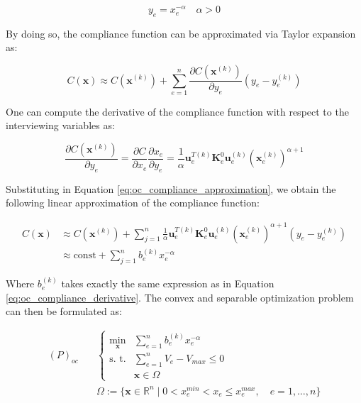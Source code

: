 \begin{equation}
    y_e = x_e^{-\alpha} \quad \alpha > 0
    \label{eq:oc_interviewing_variables}
\end{equation}

By doing so, the compliance function can be approximated via Taylor expansion as:

\begin{equation}
    C(\bm{x}) \approx C(\bm{x}^{(k)}) + \sum_{e=1}^{n} \frac{\partial C(\bm{x}^{(k)})}{\partial y_e}  (y_e - y_e^{(k)})
    \label{eq:oc_compliance_approximation}
\end{equation}

One can compute the derivative of the compliance function with respect to the interviewing variables as:

\begin{equation}
    \frac{\partial C(\bm{x}^{(k)})}{\partial y_e} = \frac{\partial C}{\partial x_e} \frac{\partial x_e}{\partial y_e} = \frac{1}{\alpha} \bm{u}_e^{T(k)} \bm{K}_{e}^0 \bm{u}_e^{(k)} (\bm{x}_e^{(k)})^{\alpha + 1}
    \label{eq:oc_compliance_derivative}
\end{equation}

Substituting in Equation \ref{eq:oc_compliance_approximation}, we obtain the following linear approximation of the compliance function:

\begin{equation}
    \begin{aligned}
        C(\bm{x}) & \approx C(\bm{x}^{(k)}) + \sum_{j=1}^{n} \frac{1}{\alpha} \bm{u}_e^{T(k)} \bm{K}_{e}^0 \bm{u}_e^{(k)} (\bm{x}_e^{(k)})^{\alpha + 1} (y_e - y_e^{(k)}) \\
                  & \approx \text{const} + \sum_{j=1}^{n} b_e^{(k)} x_e^{-\alpha}
    \end{aligned}
    \label{eq:oc_compliance_linear_approximation}
\end{equation}

Where $b_e^{(k)}$ takes exactly the same expression as in Equation \ref{eq:oc_compliance_derivative}.
The convex and separable optimization problem can then be formulated as:

\begin{equation}
    \begin{aligned}
        (P)_{oc} \quad & \begin{cases}
                             \min_{\bm{x}} & \sum_{e=1}^{n} b_e^{(k)} x_e^{-\alpha} \\
                             \text{s. t.}  & \sum_{e=1}^{n} V_e - V_{max} \leq 0    \\
                                           & \bm{x} \in \Omega
                         \end{cases}                                \\
                       & \Omega := \{ \bm{x} \in \mathbb{R}^n \mid 0 < x_e^{min} < x_e \le x_e^{max}, \quad e = 1, \dots, n \}
    \end{aligned}
    \label{eq:oc_optimization_problem}
\end{equation}

